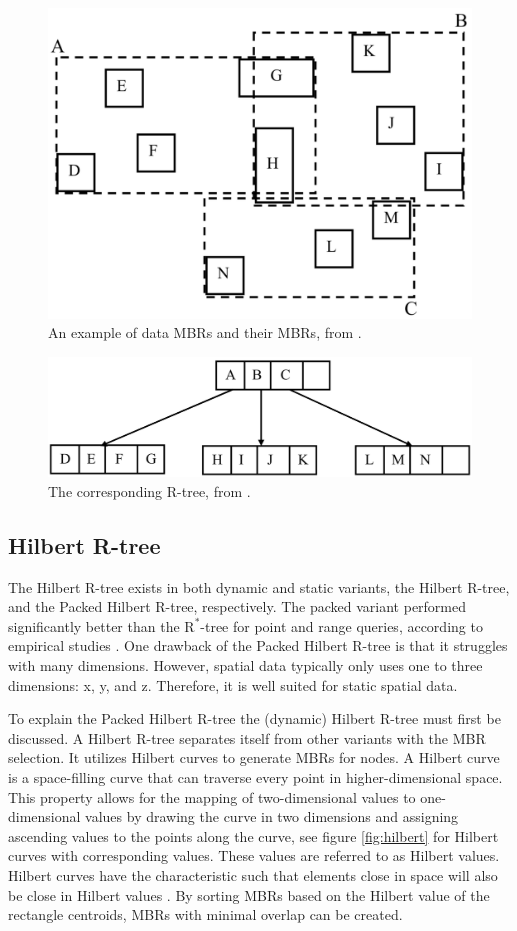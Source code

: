 \begin{figure}
    \centering
    \includegraphics[width=0.5\linewidth]{./figures/mbrs.png}
    \caption{An example of data MBRs and their MBRs, from \textcite{rtree}.}
    \label{fig:mbrs}
\end{figure}
\begin{figure}
    \centering
    \includegraphics[width=\linewidth]{./figures/rtree.png}
    \caption{The corresponding R-tree, from \textcite{rtree}.}
    \label{fig:rtree}
\end{figure}

\subsection{Hilbert R-tree}
The Hilbert R-tree exists in both dynamic and static variants, the Hilbert R-tree, and the Packed Hilbert R-tree, respectively. The packed variant performed significantly better than the $\text{R}^*$-tree for point and range queries, according to empirical studies \textcite{rtree}. One drawback of the Packed Hilbert R-tree is that it struggles with many dimensions. However, spatial data typically only uses one to three dimensions: x, y, and z. Therefore, it is well suited for static spatial data.

To explain the Packed Hilbert R-tree the (dynamic) Hilbert R-tree must first be discussed. A Hilbert R-tree separates itself from other variants with the MBR selection. It utilizes Hilbert curves to generate MBRs for nodes. A Hilbert curve is a space-filling curve that can traverse every point in higher-dimensional space. This property allows for the mapping of two-dimensional values to one-dimensional values by drawing the curve in two dimensions and assigning ascending values to the points along the curve, see figure \ref{fig:hilbert} for Hilbert curves with corresponding values. These values are referred to as Hilbert values. Hilbert curves have the characteristic such that elements close in space will also be close in Hilbert values \cite{rtree}. By sorting MBRs based on the Hilbert value of the rectangle centroids, MBRs with minimal overlap can be created.

